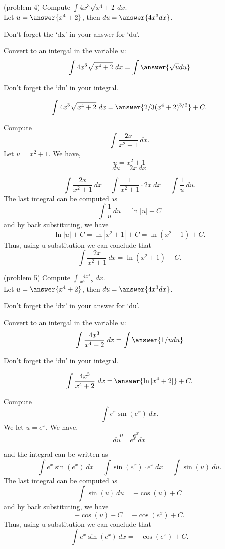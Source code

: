 \documentclass{ximera}
\begin{document}
\begin{problem}(problem 4) Compute $\displaystyle{\int 4x^3 \sqrt{x^4 +2} \ dx}$.\\
Let $u = \answer{x^4 + 2}$, then $du = \answer{4x^3 dx}$.\\
\begin{hint}
Don't forget the `dx' in your answer for `du'.
\end{hint}
Convert to an intergal in the variable $u$:
\[\int 4x^3 \sqrt{x^4 +2} \ dx = \int\answer{\sqrt u du}\]
\begin{hint}
Don't forget the `du' in your integral.
\end{hint}

\[\int 4x^3 \sqrt{x^4 +2} \ dx = \answer{2/3(x^4 +2)^{3/2}} +C.\]
\end{problem}



\begin{example}[example 5] Compute 
\[\int \frac{2x}{x^2 + 1} \ dx.\]
Let $u = x^2 + 1$.  We have,
\[u = x^2 + 1\]
\[du = 2x \ dx\]

\[\int \frac{2x}{x^2 + 1} \ dx = \int \frac{1}{x^2 + 1} \cdot 2x\  dx = \int \frac{1}{u} \ du.\]
The last integral can be computed as 
\[\int \frac{1}{u} \ du = \ln|u| + C\]
and by back substituting, we have 
\[\ln|u| + C =  \ln|x^2 + 1| + C=\ln(x^2 + 1) + C.\]
Thus, using u-substitution we can conclude that
\[\int \frac{2x}{x^2 + 1} \ dx =  \ln(x^2 + 1) + C.\]
\end{example}


\begin{problem} (problem 5) Compute $\displaystyle{\int \frac{4x^3}{x^4 +2} \ dx}$.\\
Let $u = \answer{x^4 + 2}$, then $du = \answer{4x^3 dx}$.\\
\begin{hint}
Don't forget the `dx' in your answer for `du'.
\end{hint}
Convert to an intergal in the variable $u$:
\[\int \frac{4x^3}{x^4 +2} \ dx = \int\answer{1/u du}\]
\begin{hint}
Don't forget the `du' in your integral.
\end{hint}

\[\int \frac{4x^3}{x^4 +2} \ dx = \answer{\ln|x^4 +2|} +C.\]
\end{problem}



\begin{example}[example 6] Compute 
\[\int e^x\sin(e^x) \ dx.\]
We let $u = e^x$.  We have,
\[u = e^x\]
\[du = e^x \ dx\]

and the integral can be written as 
\[\int e^x\sin(e^x) \ dx = \int \sin(e^x) \cdot e^x \  dx = \int \sin(u) \ du.\]
The last integral can be computed as 
\[\int \sin(u) \ du = -\cos(u) + C\]
and by back substituting, we have 
\[-\cos(u) + C = -\cos(e^x) + C.\]
Thus, using u-substitution we can conclude that
\[\int e^x\sin(e^x) \ dx =  -\cos(e^x) + C.\]
\end{example}
\end{document}
